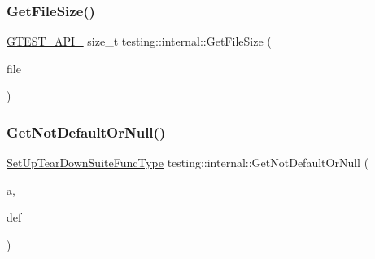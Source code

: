 \mbox{\label{namespacetesting_1_1internal_a40bcfd87e26aae36e0cc51e5db64fd89}} 
\subsubsection{\texorpdfstring{Get\+File\+Size()}{GetFileSize()}}
{\footnotesize\ttfamily \hyperlink{gtest-port_8h_aa73be6f0ba4a7456180a94904ce17790}{G\+T\+E\+S\+T\+\_\+\+A\+P\+I\+\_\+} size\+\_\+t testing\+::internal\+::\+Get\+File\+Size (\begin{DoxyParamCaption}\item[{F\+I\+LE $\ast$}]{file }\end{DoxyParamCaption})}

\mbox{\label{namespacetesting_1_1internal_a9579a78c229ea302caded45d65f77336}} 
\subsubsection{\texorpdfstring{Get\+Not\+Default\+Or\+Null()}{GetNotDefaultOrNull()}}
{\footnotesize\ttfamily \hyperlink{namespacetesting_1_1internal_a04786aa10f8b0bf38a5ead94d00475f4}{Set\+Up\+Tear\+Down\+Suite\+Func\+Type} testing\+::internal\+::\+Get\+Not\+Default\+Or\+Null (\begin{DoxyParamCaption}\item[{\hyperlink{namespacetesting_1_1internal_a04786aa10f8b0bf38a5ead94d00475f4}{Set\+Up\+Tear\+Down\+Suite\+Func\+Type}}]{a,  }\item[{\hyperlink{namespacetesting_1_1internal_a04786aa10f8b0bf38a5ead94d00475f4}{Set\+Up\+Tear\+Down\+Suite\+Func\+Type}}]{def }\end{DoxyParamCaption})\hspace{0.3cm}{\ttfamily [inline]}}

\mbox{\label{namespacetesting_1_1internal_a1e85cf16bb95b60f879d48ba1fbfc1c9}} 
